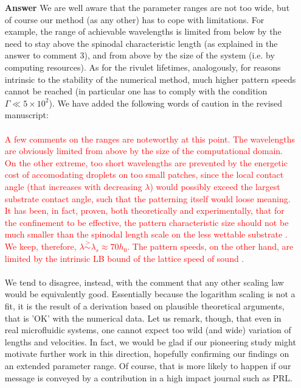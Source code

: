 \documentclass[12pt,english]{article}
\begin{document}
\begin{itemize}
\item[ \textbf{{Answer}}]
{ 
We are well aware that the parameter ranges are not too wide, but 
of course our method (as any other) has to cope with limitations. 
For example, the range of achievable wavelengths is limited from below 
by the need to stay above the spinodal characteristic length (as explained in the answer to comment 3), and from above by the size of the system (i.e. by computing resources). As for the rivulet lifetimes, analogously, for reasons intrinsic to the stability of the numerical method, much higher pattern speeds cannot be reached 
(in particular one has to comply with the condition $\Gamma \ll 5 \times 10^2$). We have added the following
words of caution in the revised manuscript:\\
\\
\textcolor{red}{A few comments on the ranges are noteworthy at this point. The wavelengths are obviously limited from above by the size of the computational domain. On the other extreme, too short wavelengths are prevented by
the energetic cost of accomodating droplets on too
small patches, since the local contact angle (that increases with decreasing $\lambda$) would possibly exceed the largest substrate contact angle, such that the patterning 
itself would loose meaning. 
It has been, in fact, proven, both theoretically and experimentally, that 
for the confinement to be effective, the pattern characteristic size should 
not be much smaller than the spinodal length scale on the less wettable substrate
\cite{KarguptaJCP2002,KarguptaLangmuir2000,Nisato1999,Karim1998}.
We keep, therefore, $\lambda \stackrel{>}{\sim} \lambda_s \approx 70 h_0$. 
The pattern speeds, on the other hand, are limited by the intrinsic LB bound of the lattice speed of sound
 \cite{succi}.}\\
\\
We tend to disagree, instead, with the comment that any other scaling 
law would be equivalently good. Essentially because the logarithm scaling is 
not a fit, it is the result of a derivation based on plausible theoretical arguments, that 
is 'OK' with the numerical data.
Let us remark, though, that even in real microfluidic systems, 
one cannot expect too wild (and wide) variation of lengths and velocities.
In fact, we would be glad if our pioneering study might motivate further work 
in this direction, hopefully confirming our findings on an extended parameter 
range. Of course, that is more likely to happen if our message is conveyed
by a contribution in a high impact journal such as PRL. 
}

\end{itemize}



\end{document}
